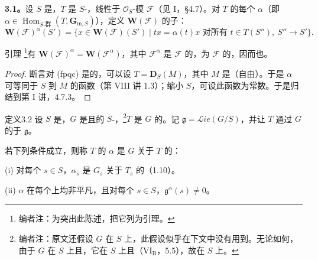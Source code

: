 \textbf{3.1。}设 $S$ 是，$T$ 是 $S$-，线性于 $\mathscr O_S$-模 $\mathscr F$（见 I，\S 4.7）。对 $T$ 的每个 $\alpha$（即 $\alpha\in\operatorname{Hom}_{S\text{-群}}(T,\mathbf G_{\mathrm m,S})$），定义 $\mathbf W(\mathscr F)$ 的子：
\[
\mathbf W(\mathscr F)^\alpha(S')=\{x\in\mathbf W(\mathscr F)(S')\mid tx=\alpha(t)x\text{ 对所有 }t\in T(S''),\ S''\to S'\}.
\]
\begin{SGAresult}{引理}{}
\footnote[26]{编者注：为突出此陈述，把它列为引理。}有 $\mathbf W(\mathscr F)^\alpha=\mathbf W(\mathscr F^\alpha)$，其中 $\mathscr F^\alpha$ 是 $\mathscr F$ 的，为 $\mathscr F$ 的，因而也。
\end{SGAresult}
\begin{proof}
断言对 (fpqc) 是的，可以设 $T=\mathbf D_S(M)$，其中 $M$ 是（自由）。于是 $\alpha$ 可等同于 $S$ 到 $M$ 的函数（第 VIII 讲 1.3）；缩小 $S$，可设此函数为常数。于是归结到第 I 讲，4.7.3。
\end{proof}
\begin{SGAresult}{定义}{3.2}
设 $S$ 是，$G$ 是且的 $S$-，\footnote[27]{编者注：原文还假设 $G$ 在 $S$ 上，此假设似乎在下文中没有用到。无论如何，由于 $G$ 在 $S$ 上且，它在 $S$ 上且（VI$_{\mathrm B}$，5.5），故在 $S$ 上。}$T$ 是 $G$ 的。记 $\mathfrak g=\mathscr{L}\!ie(G/S)$，并让 $T$ 通过 $G$ 的于 $\mathfrak g$。

若下列条件成立，则称 $T$ 的 $\alpha$ 是 $G$ 关于 $T$ 的：

(i) 对每个 $s\in S$，$\alpha_{\bar s}$ 是 $G_{\bar s}$ 关于 $T_{\bar s}$ 的（1.10）。

(ii) $\alpha$ 在每个上均非平凡，且对每个 $s\in S$，$\mathfrak g^\alpha(s)\ne0$。
\end{SGAresult}
